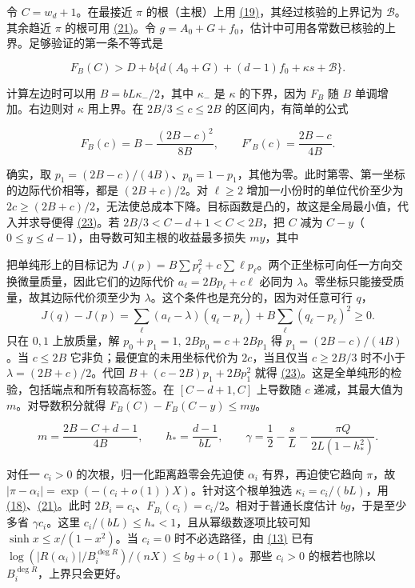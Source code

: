 \documentclass[11pt,a4paper]{article}
\begin{document}
令 \(C=w_d+1\)。在最接近 \(\pi\) 的根（主根）上用 \hyperref[eq:19]{(19)}，其经过核验的上界记为 \(\mathcal B\)。其余趋近 \(\pi\) 的根可用 \hyperref[eq:21]{(21)}。令 \(g=A_0+G+f_0\)，估计中可用各常数已核验的上界。足够验证的第一条不等式是

\[
 F_B(C)> D+b\{d(A_0+G)+(d-1)f_0+\kappa s+\mathcal B\}.                  \tag{22}\label{eq:22}
\]

计算左边时可以用 \(B=bL\kappa_-/2\)，其中 \(\kappa_-\) 是 \(\kappa\) 的下界，因为 \(F_B\) 随 \(B\) 单调增加。右边则对 \(\kappa\) 用上界。在 \(2B/3\le c\le2B\) 的区间内，有简单的公式

\[
 F_B(c)=B-\frac{(2B-c)^2}{8B},\qquad
 F'_B(c)=\frac{2B-c}{4B}.                                                 \tag{23}\label{eq:23}
\]

确实，取 \(p_1=(2B-c)/(4B)\)、\(p_0=1-p_1\)，其他为零。此时第零、第一坐标的边际代价相等，都是 \((2B+c)/2\)。对 \(\ell\ge2\) 增加一小份时的单位代价至少为 \(2c\ge(2B+c)/2\)，无法使总成本下降。目标函数是凸的，故这是全局最小值，代入并求导便得 \hyperref[eq:23]{(23)}。若 \(2B/3<C-d+1<C<2B\)，把 \(C\) 减为 \(C-y\)（\(0\le y\le d-1\)），由导数可知主根的收益最多损失 \(my\)，其中

把单纯形上的目标记为 \(J(p)=B\sum p_\ell^2+c\sum\ell p_\ell\)。两个正坐标可向任一方向交换微量质量，因此它们的边际代价 \(a_\ell=2Bp_\ell+c\ell\) 必同为 \(\lambda\)。零坐标只能接受质量，故其边际代价须至少为 \(\lambda\)。这个条件也是充分的，因为对任意可行 \(q\)， \[
 J(q)-J(p)=\sum_\ell(a_\ell-\lambda)(q_\ell-p_\ell)+B\sum_\ell(q_\ell-p_\ell)^2\ge0.
\] 只在 \(0,1\) 上放质量，解 \(p_0+p_1=1,\ 2Bp_0=c+2Bp_1\) 得 \(p_1=(2B-c)/(4B)\)。当 \(c\le2B\) 它非负；最便宜的未用坐标代价为 \(2c\)，当且仅当 \(c\ge2B/3\) 时不小于 \(\lambda=(2B+c)/2\)。代回 \(B+(c-2B)p_1+2Bp_1^2\) 就得 \hyperref[eq:23]{(23)}。这是全单纯形的检验，包括端点和所有较高标签。在 \([C-d+1,C]\) 上导数随 \(c\) 递减，其最大值为 \(m\)。对导数积分就得 \(F_B(C)-F_B(C-y)\le my\)。

\[
 m=\frac{2B-C+d-1}{4B},\qquad
 h_*=\frac{d-1}{bL},\qquad
 \gamma=\frac12-\frac{s}{L}-\frac{\pi Q}{2L(1-h_*^2)}.                  \tag{24}\label{eq:24}
\]

对任一 \(c_i>0\) 的次根，归一化距离趋零会先迫使 \(\alpha_i\) 有界，再迫使它趋向 \(\pi\)，故 \(|\pi-\alpha_i|=\exp(-(c_i+o(1))X)\)。针对这个根单独选 \(\kappa_i=c_i/(bL)\)，用 \hyperref[eq:18]{(18)}、\hyperref[eq:21]{(21)}。此时 \(2B_i=c_i\)、\(F_{B_i}(c_i)=c_i/2\)。相对于普通长度估计 \(bg\)，于是至少多省 \(\gamma c_i\)。这里 \(c_i/(bL)\le h_*<1\)，且从幂级数逐项比较可知 \(\sinh x\le x/(1-x^2)\)。当 \(c_i=0\) 时不必选路径，由 \hyperref[eq:13]{(13)} 已有 \(\log(|R(\alpha_i)|/B_i^{\deg R})/(nX)\le bg+o(1)\)。那些 \(c_i>0\) 的根若也除以 \(B_i^{\deg R}\)，上界只会更好。
\end{document}
